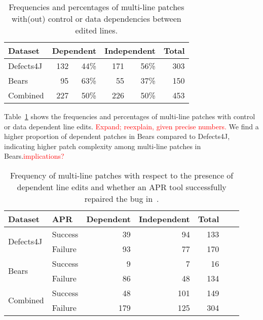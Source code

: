 \documentclass[sigconf, timestamp-false, anonymous=true]{acmart}
\newcommand\todo[1]{\textcolor{red}{#1}}
\begin{document}
\begin{table}
{\begin{center}
	\begin{tabular}{l | rr | rr | r}
		\toprule
		Dataset & \multicolumn{2}{c}{Dependent} & \multicolumn{2}{c}{Independent} & Total  \\
		\midrule
		Defects4J & 132  & 44\% & 171 & 56\% & 303 \\
		Bears & 95 & 63\% & 55 & 37\% & 150 \\
		Combined & 227 & 50\% & 226 & 50\% & 453 \\
		\bottomrule
	\end{tabular}
 \end{center}
}
	\caption{Frequencies and percentages of multi-line patches with(out) control or data 
	dependencies between edited lines.}
	\label{tab:dependency}
\end{table}

Table~\ref{tab:dependency} shows the 
frequencies and percentages of multi-line patches with control or data dependent 
line edits. \todo{Expand; reexplain, given precise numbers.}  We find a higher proportion of dependent patches in Bears compared to 
Defects4J, indicating higher patch complexity among multi-line patches in Bears.\todo{implications?}


\begin{table}
{\begin{center}
	\begin{tabular}{l | l | r r r r | r}
		\toprule
		Dataset & APR & Dependent & Independent & Total \\
		\midrule
		\multirow{2}{*}{Defects4J} & Success & 39 & 94 & 133 \\
		                                          & Failure   & 93 & 77 & 170 \\
		\midrule
		\multirow{2}{*}{Bears}       & Success &   9 &   7 &   16 \\
		                                          & Failure   & 86 & 48 & 134 \\
		\midrule
		\multirow{2}{*}{Combined}& Success & 48 &101& 149 \\
		                                          & Failure   &179&125& 304 \\
\bottomrule
	\end{tabular}
 \end{center}
}
	\caption{Frequency of multi-line patches with respect to the presence of 
	dependent line edits and whether an APR tool successfully 
	repaired the bug in~\cite{durieux-repair-them-all}.}
	\label{tab:dependency-repair-contingency-table}
\end{table}
\end{document}
